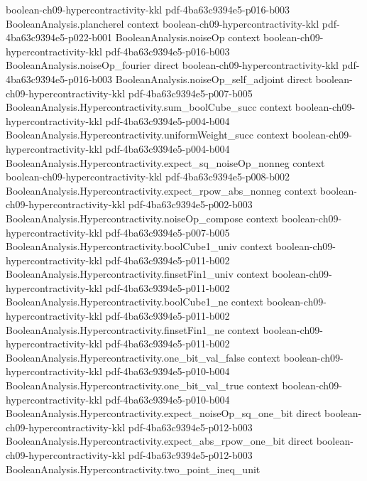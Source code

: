 \begin{theorem}
  {boolean-ch09-hypercontractivity-kkl}
  {pdf-4ba63c9394e5-p016-b003}
\proofstep
  {BooleanAnalysis.plancherel}
  {context}
  {boolean-ch09-hypercontractivity-kkl}
  {pdf-4ba63c9394e5-p022-b001}
\proofstep
  {BooleanAnalysis.noiseOp}
  {context}
  {boolean-ch09-hypercontractivity-kkl}
  {pdf-4ba63c9394e5-p016-b003}
\proofstep
  {BooleanAnalysis.noiseOp_fourier}
  {direct}
  {boolean-ch09-hypercontractivity-kkl}
  {pdf-4ba63c9394e5-p016-b003}
\proofstep
  {BooleanAnalysis.noiseOp_self_adjoint}
  {direct}
  {boolean-ch09-hypercontractivity-kkl}
  {pdf-4ba63c9394e5-p007-b005}
\proofstep
  {BooleanAnalysis.Hypercontractivity.sum_boolCube_succ}
  {context}
  {boolean-ch09-hypercontractivity-kkl}
  {pdf-4ba63c9394e5-p004-b004}
\proofstep
  {BooleanAnalysis.Hypercontractivity.uniformWeight_succ}
  {context}
  {boolean-ch09-hypercontractivity-kkl}
  {pdf-4ba63c9394e5-p004-b004}
\proofstep
  {BooleanAnalysis.Hypercontractivity.expect_sq_noiseOp_nonneg}
  {context}
  {boolean-ch09-hypercontractivity-kkl}
  {pdf-4ba63c9394e5-p008-b002}
\proofstep
  {BooleanAnalysis.Hypercontractivity.expect_rpow_abs_nonneg}
  {context}
  {boolean-ch09-hypercontractivity-kkl}
  {pdf-4ba63c9394e5-p002-b003}
\proofstep
  {BooleanAnalysis.Hypercontractivity.noiseOp_compose}
  {context}
  {boolean-ch09-hypercontractivity-kkl}
  {pdf-4ba63c9394e5-p007-b005}
\proofstep
  {BooleanAnalysis.Hypercontractivity.boolCube1_univ}
  {context}
  {boolean-ch09-hypercontractivity-kkl}
  {pdf-4ba63c9394e5-p011-b002}
\proofstep
  {BooleanAnalysis.Hypercontractivity.finsetFin1_univ}
  {context}
  {boolean-ch09-hypercontractivity-kkl}
  {pdf-4ba63c9394e5-p011-b002}
\proofstep
  {BooleanAnalysis.Hypercontractivity.boolCube1_ne}
  {context}
  {boolean-ch09-hypercontractivity-kkl}
  {pdf-4ba63c9394e5-p011-b002}
\proofstep
  {BooleanAnalysis.Hypercontractivity.finsetFin1_ne}
  {context}
  {boolean-ch09-hypercontractivity-kkl}
  {pdf-4ba63c9394e5-p011-b002}
\proofstep
  {BooleanAnalysis.Hypercontractivity.one_bit_val_false}
  {context}
  {boolean-ch09-hypercontractivity-kkl}
  {pdf-4ba63c9394e5-p010-b004}
\proofstep
  {BooleanAnalysis.Hypercontractivity.one_bit_val_true}
  {context}
  {boolean-ch09-hypercontractivity-kkl}
  {pdf-4ba63c9394e5-p010-b004}
\proofstep
  {BooleanAnalysis.Hypercontractivity.expect_noiseOp_sq_one_bit}
  {direct}
  {boolean-ch09-hypercontractivity-kkl}
  {pdf-4ba63c9394e5-p012-b003}
\proofstep
  {BooleanAnalysis.Hypercontractivity.expect_abs_rpow_one_bit}
  {direct}
  {boolean-ch09-hypercontractivity-kkl}
  {pdf-4ba63c9394e5-p012-b003}
\proofstep
  {BooleanAnalysis.Hypercontractivity.two_point_ineq_unit}

\end{theorem}
